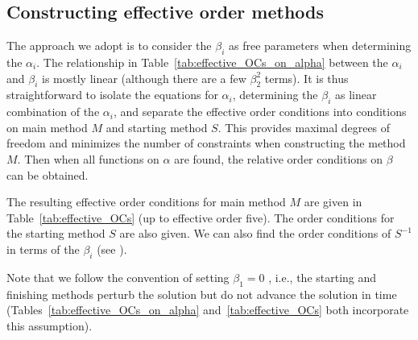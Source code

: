 \subsection{Constructing effective order methods}
The approach we adopt is to consider the $\beta_{i}$ as free
parameters when determining the $\alpha_i$.
The relationship in Table~\ref{tab:effective_OCs_on_alpha} between the
$\alpha_i$ and $\beta_i$ is mostly linear (although there are a few
$\beta_2^2$ terms).
It is thus straightforward to isolate the equations for $\alpha_i$,
determining the $\beta_i$ as linear combination of the $\alpha_i$, and
separate the effective order conditions into conditions on main method
$M$ and starting method $S$.
This provides maximal degrees of freedom and minimizes the number of
constraints when constructing the method $M$.
Then when all functions on $\alpha$ are found, the relative order
conditions on $\beta$ can be obtained.

The resulting effective order conditions for main method $M$ are given
in Table~\ref{tab:effective_OCs} (up to effective order five).
The order conditions for the starting method $S$ are also given.
We can also find the order conditions of
$S^{-1}$
in terms of the
$\beta_i$ (see \cite[Table~386(III)]{Butcher2008_book}).

Note that we follow the convention of setting $\beta_1=0$
\cite{Butcher2008_book}, i.e., the starting and finishing methods
perturb the solution but do not advance the solution in time
(Tables~\ref{tab:effective_OCs_on_alpha} and~\ref{tab:effective_OCs} both incorporate
this assumption).

